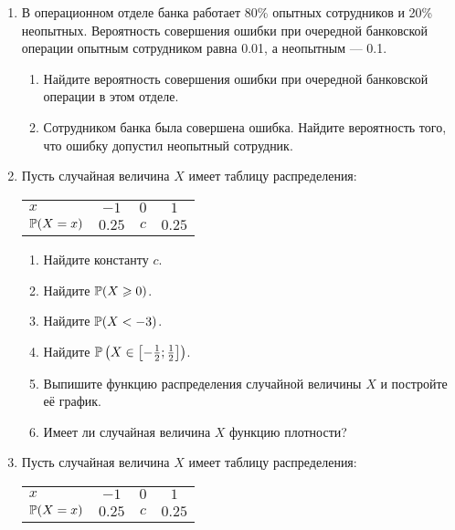 \begin{enumerate}

\item  В операционном отделе банка работает 80\% опытных сотрудников и 20\%
неопытных. Вероятность совершения ошибки при очередной банковской операции
опытным сотрудником равна 0.01, а неопытным — 0.1.

\begin{enumerate}
\item  Найдите вероятность совершения ошибки при очередной банковской операции в этом отделе.
\item  Сотрудником банка была совершена ошибка. Найдите вероятность того, 
что ошибку допустил неопытный сотрудник.
\end{enumerate}

\item  Пусть случайная величина $X$ имеет таблицу распределения:

\begin{tabular}{lccc}
	\toprule
	$x$ & $-1$  & $0$  & $1$ \\
	$\P(X = x)$ & $0.25$  & $c$  & $0.25$ \\
  \bottomrule
\end{tabular}

	\begin{enumerate}
	\item Найдите константу $c$.
	\item Найдите $\P(X \geq 0)$.
	\item Найдите $\P(X < -3)$.
	\item Найдите $\P\left(X \in \left[-\frac{1}{2}; \frac{1}{2}\right]\right)$.
	\item Выпишите функцию распределения случайной величины $X$ 
	и постройте её график. 
	\item Имеет ли случайная величина $X$ функцию плотности?
	\end{enumerate}
	

\item  Пусть случайная величина $X$ имеет таблицу распределения: %

\begin{tabular}{lccc}
\toprule
$x$ & $-1$  & $0$  & $1$ \\
$\P(X = x)$ & $0.25$ & $c$  & $0.25$ \\
\bottomrule
\end{tabular}


\end{enumerate}
